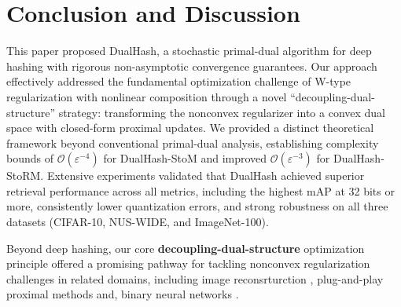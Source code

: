 \section{Conclusion and Discussion}
\label{Section: Conclusion}
This paper proposed DualHash, a stochastic primal-dual algorithm for deep hashing with rigorous non-asymptotic convergence guarantees. Our approach effectively addressed the fundamental optimization challenge of W-type regularization with nonlinear composition through a novel ``decoupling-dual-structure'' strategy: transforming the nonconvex regularizer into a convex dual space with closed-form proximal updates. We provided a distinct theoretical framework beyond conventional primal-dual analysis, establishing complexity bounds of $\mathcal{O}(\varepsilon^{-4})$ for DualHash-StoM and improved $\mathcal{O}(\varepsilon^{-3})$ for DualHash-StoRM. Extensive experiments validated that DualHash achieved superior retrieval performance across all metrics, including the highest mAP at 32 bits or more, consistently lower quantization errors, and strong robustness on all three datasets (CIFAR-10, NUS-WIDE, and ImageNet-100). 

Beyond deep hashing, our core \textbf{decoupling-dual-structure} optimization principle offered a promising pathway for tackling nonconvex regularization challenges in related domains, including image reconsrturction \cite{ding2020ldct_pfbs}, plug-and-play proximal methods \cite{JMLR:v23:20-1297} and, binary neural networks \cite{bai2019proxquant}.

